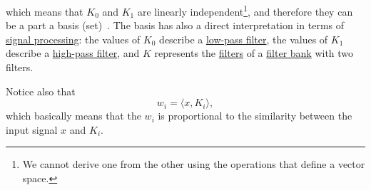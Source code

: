 which means that $K_0$ and $K_1$ are linearly independent\footnote{We
  cannot derive one from the other using the operations that define a
  vector space.}, and therefore they can be a part a basis
(set)~\cite{strang4linear}. The basis has also a direct interpretation
in terms of
\href{https://en.wikipedia.org/wiki/Signal_processing}{signal
  processing}: the values of $K_0$ describe a
\href{https://en.wikipedia.org/wiki/Low-pass_filter}{low-pass filter},
the values of $K_1$ describe a
\href{https://en.wikipedia.org/wiki/High-pass_filter}{high-pass
  filter}, and $K$ represents the
\href{https://en.wikipedia.org/wiki/Digital_filter}{filters} of a
\href{https://en.wikipedia.org/wiki/Filter_bank}{filter bank} with two
filters.

Notice also that
\begin{equation}
  w_i = \langle x, K_i\rangle,
\end{equation}
which basically means that the $w_i$ is proportional to the similarity
between the input signal $x$ and $K_i$.

